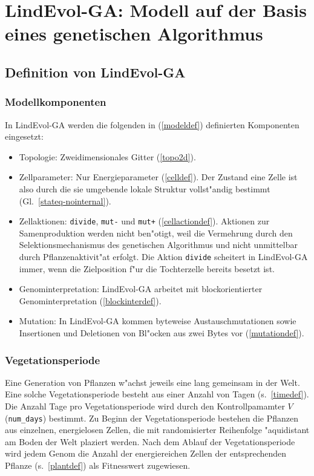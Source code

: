 \chapter[LindEvol-GA]{LindEvol-GA: Modell auf der Basis eines genetischen Algorithmus}
\label{lindevol-ga}


\section{Definition von LindEvol-GA}
\label{lndga-def}

\subsection{Modellkomponenten}

In LindEvol-GA werden die folgenden in (\ref{modeldef}) definierten Komponenten
eingesetzt:

\begin{itemize}
\item Topologie: Zweidimensionales Gitter (\protect\ref{topo2d}).
\item Zellparameter: Nur Energieparameter (\protect\ref{celldef}). Der Zustand eine
    Zelle ist also durch die sie umgebende lokale Struktur vollst"andig bestimmt
    (Gl.\ \ref{stateq-nointernal}).
\item Zellaktionen: \verb|divide|, \verb|mut-| und \verb|mut+| (\protect\ref{cellactiondef}).
    Aktionen zur Samenproduktion werden nicht ben"otigt, weil die Vermehrung durch den
    Selektionsmechanismus des genetischen Algorithmus und nicht unmittelbar
    durch Pflanzenaktivit"at erfolgt.
    Die Aktion \verb|divide| scheitert in LindEvol-GA immer, wenn die Zielposition f"ur die
    Tochterzelle bereits besetzt ist.
\item Genominterpretation: LindEvol-GA arbeitet mit blockorientierter
    Genominterpretation (\protect\ref{blockinterdef}).
\item Mutation: In LindEvol-GA kommen byteweise Austauschmutationen sowie
    Insertionen und Deletionen von Bl"ocken aus zwei Bytes vor (\protect\ref{mutationdef}).
\end{itemize}


\subsection{Vegetationsperiode}

Eine Generation von Pflanzen w"achst jeweils eine  lang
gemeinsam in der Welt. Eine solche Vegetationsperiode besteht aus
einer Anzahl von Tagen (s.\ \ref{timedef}).
Die Anzahl Tage pro Vegetationsperiode wird durch den Kontrollpamamter $V$ (\verb|num_days|)
bestimmt. Zu Beginn der
Vegetationsperiode bestehen die Pflanzen aus einzelnen, energielosen Zellen,
die mit randomisierter Reihenfolge "aquidistant am Boden der Welt plaziert werden.
Nach dem Ablauf der Vegetationsperiode wird jedem Genom die Anzahl der energiereichen
Zellen der entsprechenden Pflanze (s.\ \ref{plantdef}) als Fitnesswert
zugewiesen.



